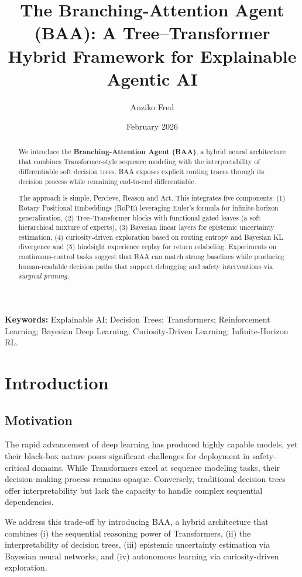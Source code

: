 \documentclass[11pt]{article}
\title{The Branching-Attention Agent (BAA): A Tree--Transformer Hybrid Framework for Explainable Agentic AI}
\author{Anziko Fred}
\date{February 2026}
\begin{document}
\maketitle

\noindent\textbf{Keywords:} Explainable AI; Decision Trees; Transformers; Reinforcement Learning; Bayesian Deep Learning; Curiosity-Driven Learning; Infinite-Horizon RL.
\medskip
\fi

\begin{abstract}
We introduce the \textbf{Branching-Attention Agent (BAA)}, a hybrid neural architecture that combines Transformer-style sequence modeling with the interpretability of differentiable soft decision trees. BAA exposes explicit routing traces through its decision process while remaining end-to-end differentiable.

The approach is simple, Percieve, Reason and Act. This integrates five components: (1) Rotary Positional Embeddings (RoPE) leveraging Euler's formula for infinite-horizon generalization, (2) Tree--Transformer blocks with functional gated leaves (a soft hierarchical mixture of experts), (3) Bayesian linear layers for epistemic uncertainty estimation, (4) curiosity-driven exploration based on routing entropy and Bayesian KL divergence and (5) hindsight experience replay for return relabeling. Experiments on continuous-control tasks suggest that BAA can match strong baselines while producing human-readable decision paths that support debugging and safety interventions via \emph{surgical pruning}.
\end{abstract}

\section{Introduction}
\subsection{Motivation}
The rapid advancement of deep learning has produced highly capable models, yet their black-box nature poses significant challenges for deployment in safety-critical domains. While Transformers excel at sequence modeling tasks, their decision-making process remains opaque. Conversely, traditional decision trees offer interpretability but lack the capacity to handle complex sequential dependencies.

We address this trade-off by introducing BAA, a hybrid architecture that combines (i) the sequential reasoning power of Transformers, (ii) the interpretability of decision trees, (iii) epistemic uncertainty estimation via Bayesian neural networks, and (iv) autonomous learning via curiosity-driven exploration.
\end{document}
